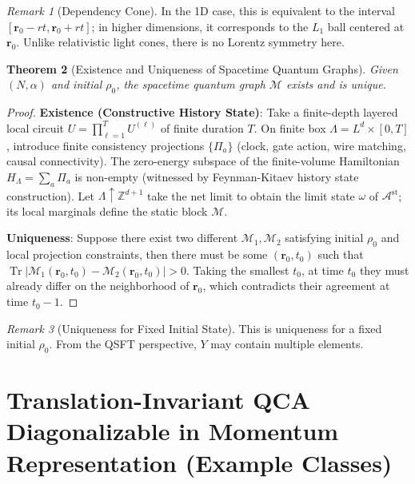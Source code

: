 \documentclass[11pt]{article}
\newtheorem{theorem}{Theorem}[section]
\theoremstyle{definition}
\theoremstyle{remark}
\newtheorem{remark}[theorem]{Remark}
\DeclareMathOperator{\Tr}{Tr}
\begin{document}
\begin{remark}[Dependency Cone]
In the 1D case, this is equivalent to the interval \( [\mathbf{r}_0 - rt, \mathbf{r}_0 + rt] \); in higher dimensions, it corresponds to the \( L_1 \) ball centered at \( \mathbf{r}_0 \). Unlike relativistic light cones, there is no Lorentz symmetry here.
\end{remark}

\begin{theorem}[Existence and Uniqueness of Spacetime Quantum Graphs]\label{thm:qexistence}
Given \( (N, \alpha) \) and initial \( \rho_0 \), the spacetime quantum graph \( \mathcal{M} \) exists and is unique.
\end{theorem}

\begin{proof}
\textbf{Existence (Constructive History State)}: Take a finite-depth layered local circuit \( U=\prod_{\ell=1}^{T}U^{(\ell)} \) of finite duration \( T \). On finite box \( \Lambda=L^d\times[0,T] \), introduce finite consistency projections \( \{\Pi_a\} \) (clock, gate action, wire matching, causal connectivity). The zero-energy subspace of the finite-volume Hamiltonian \( H_\Lambda=\sum_a\Pi_a \) is non-empty (witnessed by Feynman-Kitaev history state construction). Let \( \Lambda\uparrow\mathbb{Z}^{d+1} \) take the net limit to obtain the limit state \( \omega \) of \( \mathcal{A}^{\mathrm{st}} \); its local marginals define the static block \( \mathcal{M} \).

\textbf{Uniqueness}: Suppose there exist two different \( \mathcal{M}_1, \mathcal{M}_2 \) satisfying initial \( \rho_0 \) and local projection constraints, then there must be some \( (\mathbf{r}_0, t_0) \) such that \( \Tr | \mathcal{M}_1(\mathbf{r}_0, t_0) - \mathcal{M}_2(\mathbf{r}_0, t_0) | > 0 \). Taking the smallest \( t_0 \), at time \( t_0 \) they must already differ on the neighborhood of \( \mathbf{r}_0 \), which contradicts their agreement at time \( t_0 - 1 \).
\end{proof}

\begin{remark}[Uniqueness for Fixed Initial State]
This is uniqueness for a fixed initial \( \rho_0 \). From the QSFT perspective, \( Y \) may contain multiple elements.
\end{remark}

\section{Translation-Invariant QCA Diagonalizable in Momentum Representation (Example Classes)}\label{sec:momentum}
\end{document}

